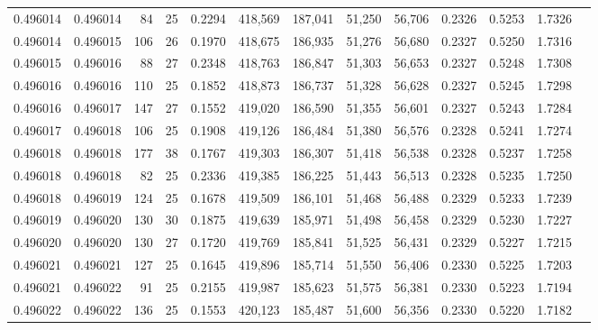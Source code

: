 \begin{tabular}{rrrrrrrrrrrrr}
0.496014 & 0.496014 &  84 &  25 &                                     0.2294 & 418,569 & 187,041 &  51,250 &  56,706 & 0.2326 & 0.5253 & 1.7326 \\
0.496014 & 0.496015 & 106 &  26 &                                     0.1970 & 418,675 & 186,935 &  51,276 &  56,680 & 0.2327 & 0.5250 & 1.7316 \\
0.496015 & 0.496016 &  88 &  27 &                                     0.2348 & 418,763 & 186,847 &  51,303 &  56,653 & 0.2327 & 0.5248 & 1.7308 \\
0.496016 & 0.496016 & 110 &  25 &                                     0.1852 & 418,873 & 186,737 &  51,328 &  56,628 & 0.2327 & 0.5245 & 1.7298 \\
0.496016 & 0.496017 & 147 &  27 &                                     0.1552 & 419,020 & 186,590 &  51,355 &  56,601 & 0.2327 & 0.5243 & 1.7284 \\
0.496017 & 0.496018 & 106 &  25 &                                     0.1908 & 419,126 & 186,484 &  51,380 &  56,576 & 0.2328 & 0.5241 & 1.7274 \\
0.496018 & 0.496018 & 177 &  38 &                                     0.1767 & 419,303 & 186,307 &  51,418 &  56,538 & 0.2328 & 0.5237 & 1.7258 \\
0.496018 & 0.496018 &  82 &  25 &                                     0.2336 & 419,385 & 186,225 &  51,443 &  56,513 & 0.2328 & 0.5235 & 1.7250 \\
0.496018 & 0.496019 & 124 &  25 &                                     0.1678 & 419,509 & 186,101 &  51,468 &  56,488 & 0.2329 & 0.5233 & 1.7239 \\
0.496019 & 0.496020 & 130 &  30 &                                     0.1875 & 419,639 & 185,971 &  51,498 &  56,458 & 0.2329 & 0.5230 & 1.7227 \\
0.496020 & 0.496020 & 130 &  27 &                                     0.1720 & 419,769 & 185,841 &  51,525 &  56,431 & 0.2329 & 0.5227 & 1.7215 \\
0.496021 & 0.496021 & 127 &  25 &                                     0.1645 & 419,896 & 185,714 &  51,550 &  56,406 & 0.2330 & 0.5225 & 1.7203 \\
0.496021 & 0.496022 &  91 &  25 &                                     0.2155 & 419,987 & 185,623 &  51,575 &  56,381 & 0.2330 & 0.5223 & 1.7194 \\
0.496022 & 0.496022 & 136 &  25 &                                     0.1553 & 420,123 & 185,487 &  51,600 &  56,356 & 0.2330 & 0.5220 & 1.7182 \\

\end{tabular}
